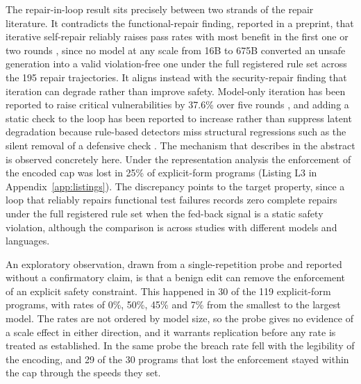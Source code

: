 \documentclass{ieeeaccess}
\begin{document}
The repair-in-loop result sits precisely between two strands of the repair literature. It
contradicts the functional-repair finding, reported in a preprint, that iterative
self-repair reliably raises pass rates with most benefit in the first one or two rounds
\cite{ref47}, since no model
at any scale from 16B to 675B converted an unsafe generation into a valid violation-free
one under the full registered rule set across the 195 repair trajectories. It aligns instead with the security-repair finding
that iteration can degrade rather than improve safety. Model-only iteration has been
reported to raise critical vulnerabilities by 37.6\% over five rounds \cite{ref53}, and
adding a static check to the loop has been reported to increase rather than suppress
latent degradation because rule-based detectors miss structural regressions such as the
silent removal of a defensive check \cite{ref54}. The mechanism that \cite{ref54}
describes in the abstract is observed concretely here. Under the representation analysis
the enforcement of the encoded cap was lost in 25\% of explicit-form programs
(Listing L3 in Appendix~\ref{app:listings}). The discrepancy points to the
target property, since a loop that reliably repairs functional test failures records zero complete repairs under the full registered rule set when the fed-back
signal is a static safety violation, although the comparison is across studies with different models and languages.

An exploratory observation, drawn from a single-repetition probe and reported without a
confirmatory claim, is that a benign edit can remove the enforcement of an explicit safety
constraint. This happened in 30 of the 119 explicit-form programs, with rates of 0\%, 50\%,
45\% and 7\% from the smallest to the largest model. The rates are not ordered by model
size, so the probe gives no evidence of a scale effect in either direction, and it warrants
replication before any rate is treated as established. In the same probe the breach rate
fell with the legibility of the encoding, and 29 of the 30 programs that lost the
enforcement stayed within the cap through the speeds they set.
\end{document}

